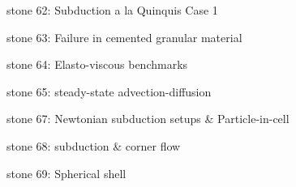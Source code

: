 {\noindent stone 62: Subduction a la Quinquis Case 1


\noindent stone 63: Failure in cemented granular material


\noindent stone 64: Elasto-viscous benchmarks 


\noindent stone 65: steady-state advection-diffusion



\noindent stone 67: Newtonian subduction setups \& Particle-in-cell


\noindent stone 68: subduction \& corner flow


\noindent stone 69: Spherical shell 


}









